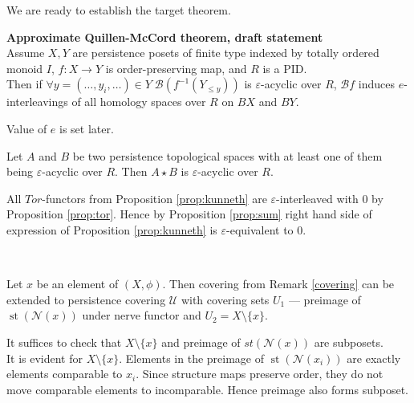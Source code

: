 We are ready to establish the target theorem.\\

\begin{theorem} \textbf{Approximate Quillen-McCord theorem, draft statement}\\
  Assume $X, Y$ are persistence posets of finite type indexed by totally ordered monoid $I$, $f : X \to Y$ is order-preserving map, and $R$ is a PID.\\

  Then if $\forall y=(\ldots,y_i,\ldots) \in Y\;\mathcal{B}(f^{-1}(Y_{\leqslant y}))$ is $\varepsilon$-acyclic over $R$, $\mathcal{B}f$ induces $e$-interleavings of all homology spaces over $R$ on $BX$ and $BY$.\\
\end{theorem}

Value of $e$ is set later.\\

\begin{proposition}
  \label{prop:acyclic}
  Let $A$ and $B$ be two persistence topological spaces with at least one of them being $\varepsilon$-acyclic over $R$. Then $A \star B$ is $\varepsilon$-acyclic over $R$.
\end{proposition}

\begin{pf}
  All $Tor$-functors from Proposition \ref{prop:kunneth} are $\varepsilon$-interleaved with $0$ by Proposition \ref{prop:tor}. Hence by Proposition \ref{prop:sum} right hand side of expression of Proposition \ref{prop:kunneth} is $\varepsilon$-equivalent to $0$.\\
\end{pf}\\

\begin{proposition}
  Let $x$ be an element of $(X,\phi)$. Then covering from Remark \ref{covering} can be extended to persistence covering $\mathcal{U}$ with covering sets $U_1$ --- preimage of $\operatorname{st}(\mathcal{N}(x))$ under nerve functor and $U_2 = X \setminus \{x\}$.
\end{proposition}

\begin{pf}
  It suffices to check that $X \setminus \{x\}$ and preimage of $st(\mathcal{N}(x))$ are subposets.\\

  It is evident for $X \setminus \{x\}$. Elements in the preimage of $\operatorname{st}(\mathcal{N}(x_i))$ are exactly elements comparable to $x_i$. Since structure maps preserve order, they do not move comparable elements to incomparable. Hence preimage also forms subposet.
\end{pf}\\

